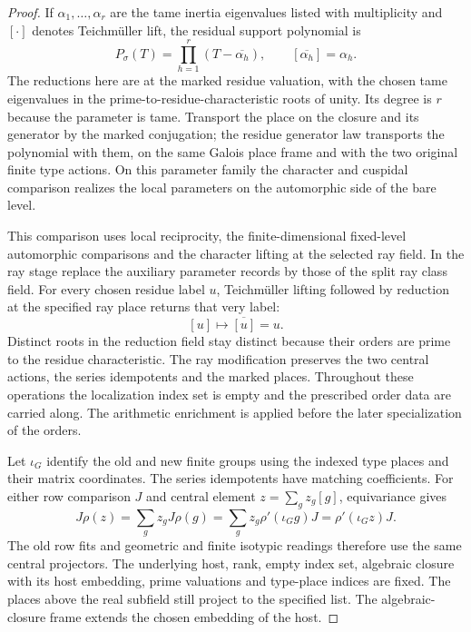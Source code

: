 \begin{proof}
If
\(\alpha_1,\ldots,\alpha_r\) are the tame inertia eigenvalues
listed with multiplicity and \([\cdot]\) denotes Teichm\"uller lift,
the residual support polynomial is
\[
 P_\sigma(T)=\prod_{h=1}^r(T-\overline{\alpha_h}),\qquad
 [\overline{\alpha_h}]=\alpha_h .
\]
The reductions here are at the marked residue valuation, with the
chosen tame eigenvalues in the prime-to-residue-characteristic
roots of unity. Its degree is \(r\) because the parameter is tame. Transport the
place on the closure and its generator by the marked conjugation;
the residue generator law transports the polynomial with them, on the same Galois place frame and with the two original finite type actions.
\label{cor:automorphic-realization-19}
On this parameter family the character and cuspidal
comparison realizes the local parameters on the automorphic
side of the bare level.

This comparison uses local reciprocity, the
finite-dimensional fixed-level automorphic comparisons and
the character lifting at the selected ray field. In the ray
stage replace the auxiliary parameter records by those of
the split ray class field. For every chosen residue label \(u\), Teichm\"uller lifting followed by reduction at the specified ray place returns that very label:
\[
 [u]\longmapsto\overline{[u]}=u .
\]
Distinct roots in the reduction field stay distinct because
their orders are prime to the residue characteristic.
The ray modification preserves the two central actions,
the series idempotents and the marked places. Throughout
these operations the localization index set is empty and
the prescribed order data are carried along. The arithmetic
enrichment is applied before the later specialization of
the orders. \label{cor:automorphic-realization-20}

Let \(\iota_G\) identify the old and new finite groups using the
indexed type places and their matrix coordinates. The series
idempotents have matching coefficients. For either row comparison
\(J\) and central element \(z=\sum_g z_g[g]\), equivariance gives
\[
 J\rho(z)=\sum_g z_g J\rho(g)
         =\sum_g z_g\rho'(\iota_G g)J=\rho'(\iota_G z)J .
\]
The old row fits and geometric and finite isotypic readings
therefore use the same central projectors. The underlying host,
rank, empty index set, algebraic closure with its host embedding,
prime valuations and type-place indices are fixed. The places
above the real subfield still project to the specified list.
\label{cor:automorphic-realization-21}
The algebraic-closure frame extends the chosen embedding
of the host.


\end{proof}
